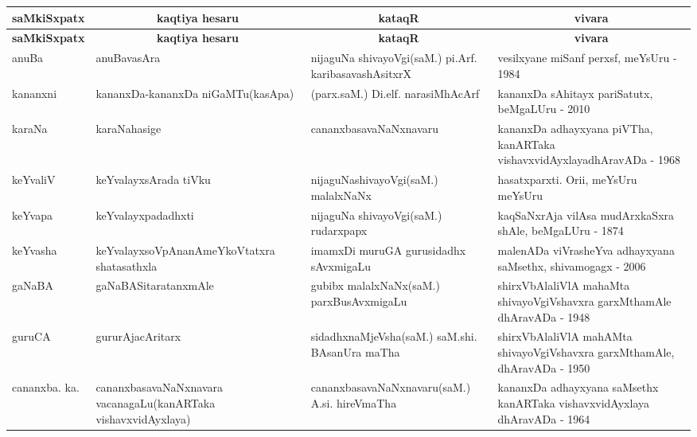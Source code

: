 {\renewcommand{\arraystretch}{1.5}
\begin{longtable}{lp{4.2cm}p{4.2cm}<{\raggedright}p{4.2cm}<{\raggedright}@{}}
\hline
\multicolumn{1}{c}{\bf saMkiSxpatx} & \multicolumn{1}{c}{\bf kaqtiya hesaru} & \multicolumn{1}{c}{\bf kataqR} & \multicolumn{1}{c}{\bf vivara}\\[3pt]
\hline
\endfirsthead
\hline
\multicolumn{1}{c}{\bf saMkiSxpatx} & \multicolumn{1}{c}{\bf kaqtiya hesaru} & \multicolumn{1}{c}{\bf kataqR} & \multicolumn{1}{c}{\bf vivara}\\[3pt]
\hline
\endhead
\endfoot
\endlastfoot
anuBa & anuBavasAra &  nijaguNa shivayoVgi\newline (saM.) pi.Arf. karibasavashAsitxrX & vesilxyane miSanf perxsf, meYsUru - 1984\\
kananxni & kananxDa-kananxDa niGaMTu\newline (kasApa) & (parx.saM.) Di.elf. narasiMhAcArf & kananxDa sAhitayx pariSatutx, beMgaLUru - 2010\\
karaNa & karaNahasige & cananxbasavaNaNxnavaru & kananxDa adhayxyana piVTha, kanARTaka vishavxvidAyxlaya\newline dhAravADa - 1968\\
keYvaliV & keYvalayxsArada tiVku & nijaguNashivayoVgi\newline (saM.) malalxNaNx & hasatxparxti. Ori{i}, meYsUru meYsUru\\ 
keYvapa & keYvalayxpadadhxti & nijaguNa shivayoVgi\newline (saM.) rudarxpapx & kaqSaNxrAja vilAsa mudArxkaSxra shAle, beMgaLUru - 1874\\
keYvasha & keYvalayxsoVpAnanAmeYkoVtatxra shatasathxla & imamxDi muruGA guru\-sidadhx\newline \phantom{AA} sAvxmigaLu & malenADa viVrasheYva adhayxyana saMsethx, shivamogagx - 2006\\
gaNaBA & gaNaBASitaratanxmAle & gubibx malalxNaNx\newline (saM.) parxBusAvxmigaLu & shirxVbAlaliVlA mahaMta shivayoVgiVshavxra garxMthamAle\newline \phantom{AA} dhAravADa - 1948\\
guruCA & gururAjacAritarx & sidadhxnaMjeVsha\newline (saM.) saM.shi. BAsanUra maTha & shirxVbAlaliVlA mahAMta shivayoVgiVshavxra garxMthamAle, dhAravADa - 1950\\
cananxba. ka. & cananxbasavaNaNxnavara vacanagaLu\newline (kanARTaka vishavxvidAyxlaya) & cananxbasavaNaNxnavaru\newline (saM.) A.si. hireVmaTha & kananxDa adhayxyana saMsethx\newline \phantom{AA} kanARTaka vishavxvidAyxlaya\newline \phantom{AA} dhAravADa - 1964\\

\end{longtable}}
